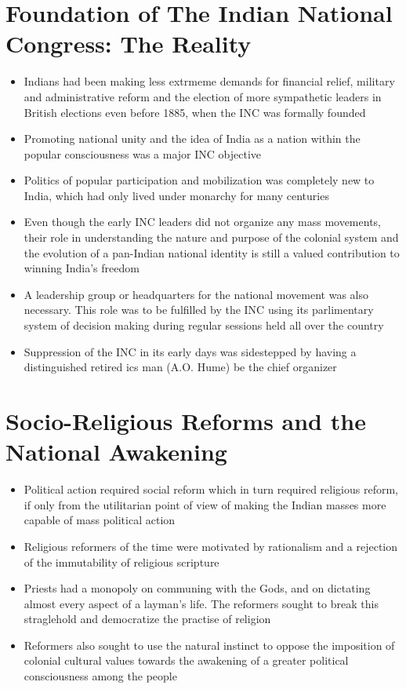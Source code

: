 \section{Foundation of The Indian National Congress: The Reality}
\begin{itemize}
    \item Indians had been making less extrmeme demands for financial relief, military and administrative reform and the election of more sympathetic leaders in British elections even before 1885, when the INC was formally founded
    \item Promoting national unity and the idea of India as a nation within the popular consciousness was a major INC objective
    \item Politics of popular participation and mobilization was completely new to India, which had only lived under monarchy for many centuries
    \item Even though the early INC leaders did not organize any mass movements, their role in understanding the nature and purpose of the colonial system and the evolution of a pan-Indian national identity is still a valued contribution to winning India's freedom
    \item A leadership group  or headquarters for the national movement was also necessary. This role was to be fulfilled by the INC using its parlimentary system of decision making during regular sessions held all over the country
    \item Suppression of the INC in its early days was sidestepped by having a distinguished retired \gls{ics} man (A.O. Hume) be the chief organizer
\end{itemize}

\section{Socio-Religious Reforms and the National Awakening}
\begin{itemize}
    \item Political action required social reform which in turn required religious reform, if only from the utilitarian point of view of making the Indian masses more capable of mass political action
    \item Religious reformers of the time were motivated by rationalism and a rejection of the immutability of religious scripture
    \item Priests had a monopoly on communing with the Gods, and on dictating almost every aspect of a layman's life. The reformers sought to break this straglehold and democratize the practise of religion
    \item Reformers also sought to use the natural instinct to oppose the imposition of colonial cultural values towards the awakening of a greater political consciousness among the people
\end{itemize}

